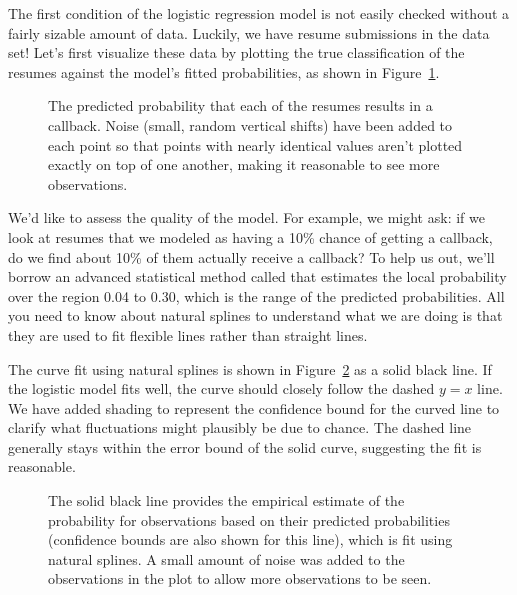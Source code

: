 The first condition of the logistic regression model is not
easily checked without a fairly sizable amount of data.
Luckily, we have \resN{} resume submissions in the data set!
Let's first visualize these data by plotting the true
classification of the resumes against the model's fitted
probabilities, as shown in
Figure~\ref{logisticModelPredict}.

\begin{figure}[h]
  \centering
  \caption{The predicted probability that each of the
      \resN{} resumes results in a callback.
      Noise (small, random vertical shifts) have been added
      to each point so that points with nearly identical
      values aren't plotted exactly on top of one another,
      making it reasonable to see more observations.}
  \label{logisticModelPredict}
\end{figure}

We'd like to assess the quality of the model.
For example, we might ask:
if we look at resumes that we modeled as having
a 10\% chance of getting a callback, do we find
about 10\% of them actually receive a callback?
To help us out, we'll borrow an advanced statistical
method called  that estimates
the local probability over the region 0.04 to 0.30,
which is the range of the predicted probabilities.
All you need to know about natural splines to understand
what we are doing is that they are used to fit flexible
lines rather than straight lines.

The curve fit using natural splines is shown in
Figure~\ref{logisticModelSpline} as a solid black line.
If the logistic model fits well, the curve should closely
follow the dashed $y = x$ line.
We have added shading to represent the confidence bound for
the curved line to clarify what fluctuations might plausibly
be due to chance.
The dashed line generally stays within the error bound
of the solid curve, suggesting the fit is reasonable.

\begin{figure}
  \centering
  \caption{The solid black line provides the empirical
      estimate of the probability for observations based
      on their predicted probabilities
      (confidence bounds are also shown for this line),
      which is fit using natural splines.
      A small amount of noise was added to the observations
      in the plot to allow more observations to be seen.}
  \label{logisticModelSpline}
\end{figure}

